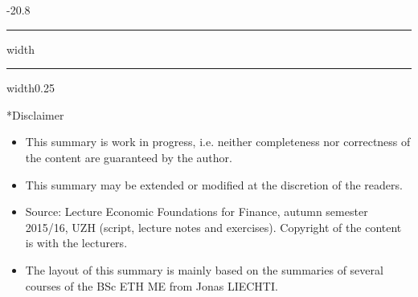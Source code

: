 \documentclass[a4paper,landscape,7pt,fleqn]{scrartcl}
\makeatletter
\renewcommand{\section}{\@startsection{section}{1}{0mm}%
{-2\baselineskip}{0.8\baselineskip}%
{\hrule depth 0.2pt width\columnwidth\hrule depth1.5pt
width0.25\columnwidth\vspace*{1.2em}\Large\bfseries}}
\makeatother
\begin{document}
\begin{multicols*}{3}
\section*{Disclaimer}

\begin{itemize}
\item This summary is work in progress, i.e. neither completeness nor correctness of the content are guaranteed by the author.
\item This summary may be extended or modified at the discretion of the readers.
\item Source: Lecture Economic Foundations for Finance, autumn semester 2015/16, UZH (script, lecture notes and exercises). Copyright of the content is with the lecturers.
\item The layout of this summary is mainly based on the summaries of several courses of the BSc ETH ME from Jonas LIECHTI.
\end{itemize}

\end{multicols*}
\end{document}
